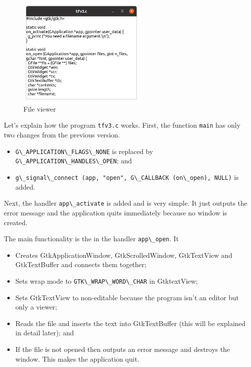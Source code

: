 \begin{figure}
\centering
\includegraphics[width=6.3cm,height=5.325cm]{../image/screenshot_tfv3.png}
\caption{File viewer}
\end{figure}

Let's explain how the program \passthrough{\lstinline!tfv3.c!} works.
First, the function \passthrough{\lstinline!main!} has only two changes
from the previous version.

\begin{itemize}
\tightlist
\item
  \passthrough{\lstinline!G\_APPLICATION\_FLAGS\_NONE!} is replaced by
  \passthrough{\lstinline!G\_APPLICATION\_HANDLES\_OPEN!}; and
\item
  \passthrough{\lstinline!g\_signal\_connect (app, "open", G\_CALLBACK (on\_open), NULL)!}
  is added.
\end{itemize}

Next, the handler \passthrough{\lstinline!app\_activate!} is added and
is very simple. It just outputs the error message and the application
quits immediately because no window is created.

The main functionality is the in the handler
\passthrough{\lstinline!app\_open!}. It

\begin{itemize}
\tightlist
\item
  Creates GtkApplicationWindow, GtkScrolledWindow, GtkTextView and
  GtkTextBuffer and connects them together;
\item
  Sets wrap mode to \passthrough{\lstinline!GTK\_WRAP\_WORD\_CHAR!} in
  GtktextView;
\item
  Sets GtkTextView to non-editable because the program isn't an editor
  but only a viewer;
\item
  Reads the file and inserts the text into GtkTextBuffer (this will be
  explained in detail later); and
\item
  If the file is not opened then outputs an error message and destroys
  the window. This makes the application quit.
\end{itemize}

